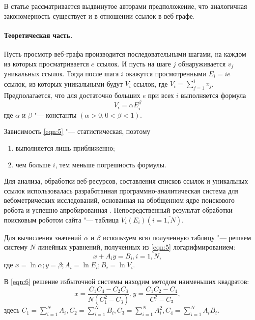 В статье рассматривается выдвинутое авторами предположение, что аналогичная закономерность существует и в отношении ссылок в веб-графе.

\paragraph{Теоретическая часть.} Пусть просмотр веб-графа производится последовательными шагами, на каждом из которых просматривается \(e\) ссылок. И пусть на шаге \(j\) обнаруживается \(v_j\) уникальных ссылок. Тогда после шага \(i\) окажутся просмотренными \(E_i = ie\) ссылок, из которых уникальными будут \(V_i\) ссылок, где \(V_i = \sum_{j=1}^{i} v_j\). Предполагается, что для достаточно больших \(e\) при всех \(i\) выполняется формула
\begin{equation}
	\label{eqn:5}
	V_i = \alpha E_i^\beta
\end{equation}
где \(\alpha\) и \(\beta\) "--- константы \((\alpha > 0, 0 < \beta < 1)\).

Зависимость \cref{eqn:5} "--- статистическая, поэтому
\begin{enumerate}
	\item выполняется лишь приближенно;
	\item чем больше \(i\), тем меньше погрешность формулы.
\end{enumerate}

Для анализа, обработки веб-ресурсов, составления списков ссылок и уникальных
ссылок использовалась разработанная программно-аналитическая система для вебометрических исследований, основанная на обобщенном ядре поискового робота \cite{BlekanovSergeevMartynenko} и успешно апробированная \cite{MaksimovBlekanov,BlekanovSergeevMaksimovBOWTIE}. Непосредственный результат обработки поисковым роботом сайта "--- таблица \(V_i (E_i) (i = \overline{1,N})\).

Для вычисления значений \(\alpha\) и \(\beta\) используем всю полученную таблицу "--- решаем систему \(N\) линейных уравнений, полученных из \cref{eqn:5} логарифмированием:
\begin{equation}
	\label{eqn:6}
	x + A_i y = B_i, i = \overline{1,N},
\end{equation} где \(x = \ln{\alpha}; y = \beta; A_i = \ln{E_i}; B_i = \ln{V_i}\).

В \cref{eqn:6} решение избыточной системы находим методом наименьших квадратов:
\[
x = \frac{C_1 C_4 - C_2 C_3}{N (C_1^2 - C_3)}, y = \frac{C_1 C_2 - C_4}{C_1^2 - C_3},
\] здесь \( C_1 = \sum_{i=1}^{N} A_i, C_2 = \sum_{i = 1}^{N} B_i, C_3 = \sum_{i = 1}^{N} A_i^2 , C_4 = \sum_{i=1}^{N} A_i B_i .\)

